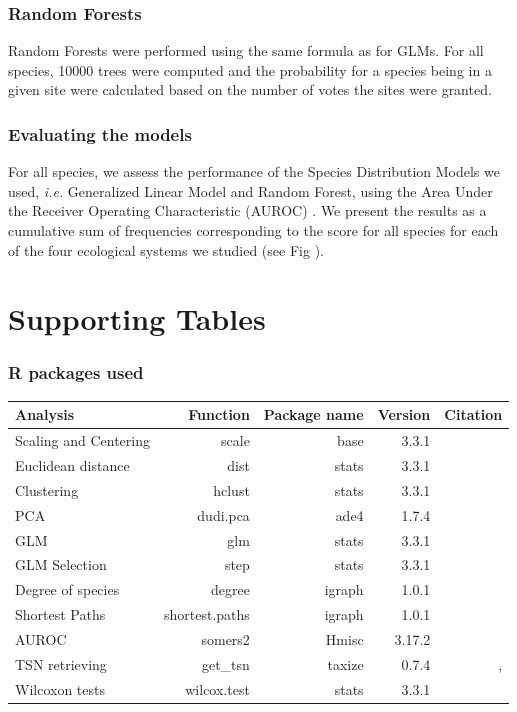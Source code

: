 \subsubsection{Random Forests}\label{random-forests}

Random Forests \citep{Prasad_2006} were performed using the same formula
as for GLMs. For all species, 10000 trees were computed and the
probability for a species being in a given site were calculated based on
the number of votes the sites were granted.

\subsubsection{Evaluating the models}\label{evaluating-the-models}

For all species, we assess the performance of the Species Distribution
Models we used, \emph{i.e.} Generalized Linear Model and Random Forest,
using the Area Under the Receiver Operating Characteristic (AUROC)
\citep{Elith_2006}. We present the results as a cumulative sum of
frequencies corresponding to the score for all species for each of the
four ecological systems we studied (see Fig \citet{fig:idauc}).

\section{Supporting Tables}\label{supporting-tables}

\subsubsection{R packages used}\label{r-packages-used}

\begin{longtable}[]{@{}lrrrr@{}}
\toprule
Analysis & Function & Package name & Version & Citation\tabularnewline
\midrule
\endhead
Scaling and Centering & scale & base & 3.3.1 &
\citet{Rcoreteam2015}\tabularnewline
Euclidean distance & dist & stats & 3.3.1 &
\citet{Rcoreteam2015}\tabularnewline
Clustering & hclust & stats & 3.3.1 &
\citet{Rcoreteam2015}\tabularnewline
PCA & dudi.pca & ade4 & 1.7.4 & \citet{Dray2007}\tabularnewline
GLM & glm & stats & 3.3.1 & \citet{Rcoreteam2015}\tabularnewline
GLM Selection & step & stats & 3.3.1 &
\citet{Rcoreteam2015}\tabularnewline
Degree of species & degree & igraph & 1.0.1 &
\citet{Csardi2006}\tabularnewline
Shortest Paths & shortest.paths & igraph & 1.0.1 &
\citet{Csardi2006}\tabularnewline
AUROC & somers2 & Hmisc & 3.17.2 & \citet{Harrell2016}\tabularnewline
TSN retrieving & get\_tsn & taxize & 0.7.4 & \citet{hamberlain2013},
\citet{Chamberlain2016}\tabularnewline
Wilcoxon tests & wilcox.test & stats & 3.3.1 &
\citet{Rcoreteam2015}\tabularnewline
\bottomrule
\end{longtable}

